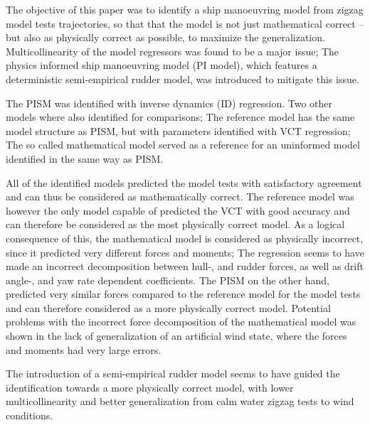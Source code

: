 The objective of this paper was to identify a ship manoeuvring model from zigzag model tests trajectories, so that that the model is not just mathematical correct -- but also as physically correct as possible, to maximize the generalization. Multicollinearity of the model regressors was found to be a major issue; The physics informed ship manoeuvring model (PI model), which features a deterministic semi-empirical rudder model, was introduced to mitigate this issue. 

The PISM was identified with inverse dynamics (ID) regression. Two other models where also identified for comparisons;
The reference model has the same model structure as PISM, but with parameters identified with VCT regression; The so called mathematical model served as a reference for an uninformed model identified in the same way as PISM.

All of the identified models predicted the model tests with satisfactory agreement and can thus be considered as mathematically correct.
The reference model was however the only model capable of predicted the VCT with good accuracy and can therefore be considered as the most physically correct model.
As a logical consequence of this, the mathematical model is considered as physically incorrect, since it predicted very different forces and moments; The regression seems to have made an incorrect decomposition between hull-, and rudder forces, as well as drift angle-, and yaw rate dependent coefficients.
The PISM on the other hand, predicted very similar forces compared to the reference model for the model tests and can therefore considered as a more physically correct model.
Potential problems with the incorrect force decomposition of the mathematical model was shown in the lack of generalization of an artificial wind state, where the forces and moments had very large errors.

The introduction of a semi-empirical rudder model seems to have guided the identification towards a more physically correct model, with lower multicollinearity and better generalization from calm water zigzag tests to wind conditions.

